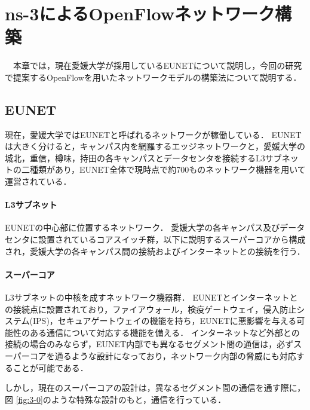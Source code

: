 \chapter{ns-3によるOpenFlowネットワーク構築}

　本章では，現在愛媛大学が採用しているEUNETについて説明し，今回の研究で提案するOpenFlowを用いたネットワークモデルの構築法について説明する．

\section{EUNET}

現在，愛媛大学ではEUNETと呼ばれるネットワークが稼働している．
EUNETは大きく分けると，キャンパス内を網羅するエッジネットワークと，愛媛大学の城北，重信，樽味，持田の各キャンパスとデータセンタを接続するL3サブネットの二種類があり，EUNET全体で現時点で約700ものネットワーク機器を用いて運営されている．

\subsubsection{L3サブネット}

EUNETの中心部に位置するネットワーク．
愛媛大学の各キャンパス及びデータセンタに設置されているコアスイッチ群，以下に説明するスーパーコアから構成され，愛媛大学の各キャンパス間の接続およびインターネットとの接続を行う．

\subsubsection{スーパーコア}

L3サブネットの中核を成すネットワーク機器群．
EUNETとインターネットとの接続点に設置されており，ファイアウォール，検疫ゲートウェイ，侵入防止システム(IPS)，セキュアゲートウェイの機能を持ち，EUNETに悪影響を与える可能性のある通信について対応する機能を備える．
インターネットなど外部との接続の場合のみならず，EUNET内部でも異なるセグメント間の通信は，必ずスーパーコアを通るような設計になっており，ネットワーク内部の脅威にも対応することが可能である．

しかし，現在のスーパーコアの設計は，異なるセグメント間の通信を通す際に，図 \ref{fig:3-0}のような特殊な設計のもと，通信を行っている．


